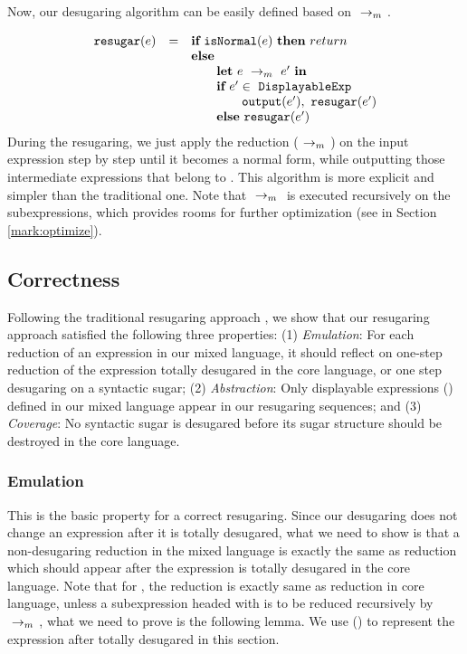
Now, our desugaring algorithm can be easily defined based on $~\rightarrow_m~$.

\[
\begin{array}{llll}
\mbox{\tt resugar} (e) &=& \mbox{\rm \bf if}~\mbox{\tt isNormal}(e)~\mbox{\rm \bf then}~return\\
              & & \mbox{\rm \bf else}~\\
							& & \qquad \mbox{\rm \bf let}~e ~\rightarrow_m~e'~\mbox{\rm \bf in}\\
							& & \qquad \mbox{\rm \bf if}~e' \in~\mbox{\tt DisplayableExp} \\
							& & \qquad \qquad \mbox{\tt output}(e'),~\mbox{\tt resugar}(e')\\
							& & \qquad \mbox{\rm \bf else}~\mbox{\tt resugar}(e')
\end{array}
\]
During the resugaring, we just apply the reduction ($~\rightarrow_m~$) on the input expression step by step until it becomes a normal form, while outputting those intermediate expressions that belong to . This algorithm is more explicit and simpler than the traditional one. Note that $~\rightarrow_m~$ is executed recursively on the subexpressions, which provides rooms for further optimization (see in Section \ref{mark:optimize}).

\subsection{Correctness}
\label{mark:correct}

Following the traditional resugaring approach \cite{resugaring,hygienic}, we show that our resugaring approach satisfied the following three properties:
(1)
\emph{Emulation}: For each reduction of an expression in our mixed language, it should reflect on one-step reduction of the expression totally desugared in the core language, or one step desugaring on a syntactic sugar;
(2)
\emph{Abstraction}: Only displayable expressions () defined in our mixed language appear in our resugaring sequences; and
(3)
\emph{Coverage}: No syntactic sugar is desugared before its sugar structure should be destroyed in the  core language.

\subsubsection{Emulation} This is the basic property for a correct resugaring. Since our desugaring does not change an expression after it is totally desugared, what we need to show is that a non-desugaring reduction in the mixed language is exactly the same as reduction which should appear after the expression is totally desugared in the core language. Note that for , the reduction is exactly same as reduction in core language, unless a subexpression headed with  is to be reduced recursively by $~\rightarrow_m~$, what we need to prove is the following lemma. We use () to represent the expression after  totally desugared in this section.

